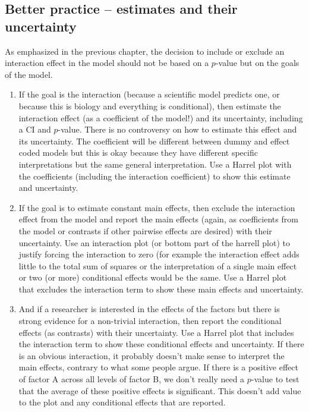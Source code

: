 \documentclass[]{book}
\begin{document}
\hypertarget{better-practice-estimates-and-their-uncertainty}{%
\subsection{Better practice -- estimates and their uncertainty}\label{better-practice-estimates-and-their-uncertainty}}

As emphasized in the previous chapter, the decision to include or exclude an interaction effect in the model should not be based on a \(p\)-value but on the goals of the model.

\begin{enumerate}
\def\labelenumi{\arabic{enumi}.}
\item
  If the goal is the interaction (because a scientific model predicts one, or because this is biology and everything is conditional), then estimate the interaction effect (as a coefficient of the model!) and its uncertainty, including a CI and \(p\)-value. There is no controversy on how to estimate this effect and its uncertainty. The coefficient will be different between dummy and effect coded models but this is okay because they have different specific interpretations but the same general interpretation. Use a Harrel plot with the coefficients (including the interaction coefficient) to show this estimate and uncertainty.
\item
  If the goal is to estimate constant main effects, then exclude the interaction effect from the model and report the main effects (again, as coefficients from the model or contrasts if other pairwise effects are desired) with their uncertainty. Use an interaction plot (or bottom part of the harrell plot) to justify forcing the interaction to zero (for example the interaction effect adds little to the total sum of squares or the interpretation of a single main effect or two (or more) conditional effects would be the same. Use a Harrel plot that excludes the interaction term to show these main effects and uncertainty.
\item
  And if a researcher is interested in the effects of the factors but there is strong evidence for a non-trivial interaction, then report the conditional effects (as contrasts) with their uncertainty. Use a Harrel plot that includes the interaction term to show these conditional effects and uncertainty. If there is an obvious interaction, it probably doesn't make sense to interpret the main effects, contrary to what some people argue. If there is a positive effect of factor A across all levels of factor B, we don't really need a \(p\)-value to test that the average of these positive effects is significant. This doesn't add value to the plot and any conditional effects that are reported.
\end{enumerate}
\end{document}
